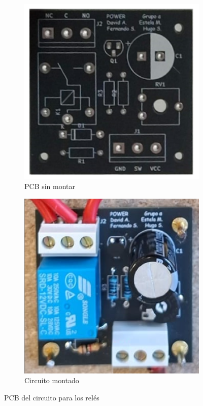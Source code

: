 \begin{figure}[H]
    \centering
    \begin{subfigure}[b]{0.45\textwidth}
        \includegraphics[width=\textwidth]{images/2-hardware/componentes/rele/pcbRele.png}
        \caption{PCB sin montar}
    \end{subfigure}
    \hfill
    \begin{subfigure}[b]{0.45\textwidth}
        \includegraphics[width=\textwidth]{images/2-hardware/componentes/rele/pcbReleMontada.png}
        \caption{Circuito montado}
    \end{subfigure}
    \caption{PCB del circuito para los relés}
    \label{fig:hardware/modulos/reles/fotoPCB}
\end{figure}


